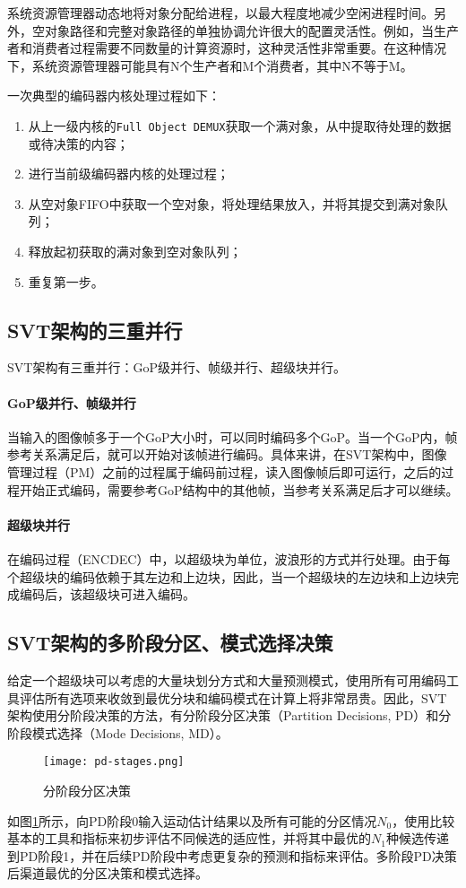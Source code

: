   系统资源管理器动态地将对象分配给进程，以最大程度地减少空闲进程时间。另外，空对象路径和完整对象路径的单独协调允许很大的配置灵活性。例如，当生产者和消费者过程需要不同数量的计算资源时，这种灵活性非常重要。在这种情况下，系统资源管理器可能具有N个生产者和M个消费者，其中N不等于M。

  一次典型的编码器内核处理过程如下：
  \begin{enumerate} [label=\arabic*)]
    \item 从上一级内核的\texttt{Full Object DEMUX}获取一个满对象，从中提取待处理的数据或待决策的内容；
    \item 进行当前级编码器内核的处理过程；
    \item 从空对象FIFO中获取一个空对象，将处理结果放入，并将其提交到满对象队列；
    \item 释放起初获取的满对象到空对象队列；
    \item 重复第一步。
  \end{enumerate}

  \subsection{SVT架构的三重并行}
  SVT架构有三重并行：GoP级并行、帧级并行、超级块并行。
  \paragraph{GoP级并行、帧级并行} 当输入的图像帧多于一个GoP大小时，可以同时编码多个GoP。当一个GoP内，帧参考关系满足后，就可以开始对该帧进行编码。具体来讲，在SVT架构中，图像管理过程（PM）之前的过程属于编码前过程，读入图像帧后即可运行，之后的过程开始正式编码，需要参考GoP结构中的其他帧，当参考关系满足后才可以继续。
  \paragraph{超级块并行} 在编码过程（ENCDEC）中，以超级块为单位，波浪形的方式并行处理。由于每个超级块的编码依赖于其左边和上边块，因此，当一个超级块的左边块和上边块完成编码后，该超级块可进入编码。

  \subsection{SVT架构的多阶段分区、模式选择决策} \label{sec:pd-md}
  给定一个超级块可以考虑的大量块划分方式和大量预测模式，使用所有可用编码工具评估所有选项来收敛到最优分块和编码模式在计算上将非常昂贵。因此，SVT架构使用分阶段决策的方法\cite{EncoderDesignSVTAV1}，有分阶段分区决策（Partition Decisions, PD）和分阶段模式选择（Mode Decisions, MD）。
	\begin{figure}[htbp]
		\centering
		\texttt{[image: pd-stages.png]}
		\caption{分阶段分区决策\cite{EncoderDesignSVTAV1}}
		\label{fig:pd}
	\end{figure}
  如图\ref{fig:pd}所示，向PD阶段0输入运动估计结果以及所有可能的分区情况$N_0$，使用比较基本的工具和指标来初步评估不同候选的适应性，并将其中最优的$N_1$种候选传递到PD阶段1，并在后续PD阶段中考虑更复杂的预测和指标来评估。多阶段PD决策后渠道最优的分区决策和模式选择。


